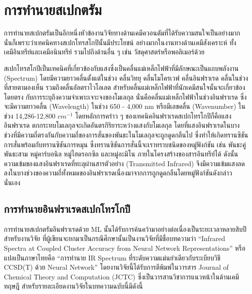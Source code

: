\section{การทำนายสเปกตรัม}
\label{sec:pred_spectra}

การทำนายสเปกตรัมเป็นอีกหนึ่งหัวข้องานวิจัยทางด้านเคมีควอนตัมที่ได้รับความสนใจเป็นอย่างมากนั่นก็เพราะว่าเทคนิคทางสเปกโทรสโกปีนั้นมีประโยชน์%
อย่างมากในงานทางด้านเคมีสังเคราะห์ ทั้งเคมีอินทรีย์และเคมีอนินทรีย์ รวมไปถึงด้านอื่น ๆ เช่น วัสดุศาสตร์หรือพอลิเมอร์ด้วย 

สเปกโทรสโกปีเป็นเทคนิคที่เกี่ยวข้องกับแสงซึ่งเป็นคลื่นแม่เหล็กไฟฟ้าที่มีลักษณะเป็นแถบพลังงาน (Spectrum) โดยมีความยาวคลื่นตั้งแต่ในช่วง คลื่นวิทยุ 
คลื่นไมโครเวฟ คลื่นอินฟราเรด คลื่นในช่วงที่สายตามองเห็น รวมถึงคลื่นอัลตราไวโอเลต สำหรับคลื่นแม่เหล็กไฟฟ้าที่นักเคมีสนใจนั้นจะเกี่ยวข้องโดยตรง%
กับการระบุถึงความจำเพาะเจาะจงของโมเลกุล นั่นคือคลื่นแม่เหล็กไฟฟ้าในช่วงอินฟราเรด ซึ่งจะมีความยาวคลื่น (Wavelength) ในช่วง 650 - 4,000 
nm หรือมีเลขคลื่น (Wavenumber) ในช่วง 14,286-12,800 $cm^{-1}$ โดยหลักการคร่าว ๆ ของเทคนิคอินฟราเรดสเปกโทรโกปีก็คือแสงอินฟราเรด%
ตกกระทบโมเลกุลจะเกิดอันตรกิริยาระหว่างแสงกับโมเลกุล โดยที่แสงอินฟราเรดในบางช่วงที่มีความถี่ตรงกันกับความถี่ของการสั่นของพันธะในโมเลกุลจะถูกดูดกลืนไป 
ซึ่งทำให้เกิดทรานซิชันการสั่นพร้อมกับทรานซิชันการหมุน ซึ่งทรานซิชันการสั่นนี้จะเราทราบชนิดของหมู่ฟังก์ชัน เช่น พันธะคู่ พันธะสาม หมู่คาร์บอนิล 
หมู่ไฮดรอกซิล และหมู่อะมิโน ภายในโครงสร้างของสารอินทรีย์ได้ ดังนั้นความเข้มของแสงอินฟราเรดที่ทะลุผ่านสารตัวอย่าง (Transmitted Infrared) 
จึงมีความเข้มแสงลดลงในบางช่วงของความถี่ทั้งหมดของอินฟราเรดเนื่องมาจากการถูกดูดกลืนโดยหมู่ฟังก์ชันดังกล่าวนั่นเอง

\subsection{การทำนายอินฟราเรดสเปกโทรโกปี}
\label{ssec:pred_spec_ir}

การทำนายสเปกตรัมอินฟราเรดด้วย ML นั้นได้รับการค้นคว้ามาอย่างต่อเนื่องเป็นระยะเวลาหลายสิบปี\autocite{gastegger2017} สำหรับงานวิจัย%
ที่ผู้เขียนจะยกมาเป็นกรณีศึกษานั้นเป็นงานวิจัยที่มีชื่อบทความว่า \enquote{Infrared Spectra at Coupled Cluster Accuracy from Neural 
Network Representations} หรือแปลเป็นภาษาไทยคือ \enquote{การทำนาย IR Spectrum ที่ระดับความแม่นยำเดียวกับระเบียบวิธี CCSD(T) 
ด้วย Neural Network}\autocite{beckmann2022} โดยงานวิจัยนี้ได้รับการตีพิมพ์ในวารสาร Journal of Chemical Theory and Computation 
(JCTC) ซึ่งเป็นวารสานวิชาการแนวหน้าในด้านเคมีทฤษฎี สำหรับรายละเอียดงานวิจัยในบทความฉบับนี้มีดังนี้

